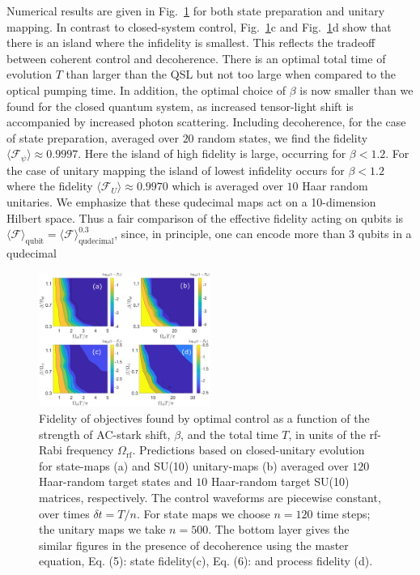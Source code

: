 \documentclass[aps,prl,twocolumn,reprint,superscriptaddress,footinbib]{revtex4-2}
\begin{document}
Numerical results are given in Fig.~\ref{fig:decohrence_quantum_control} for both state preparation and unitary mapping. In contrast to closed-system control,  Fig.~\ref{fig:decohrence_quantum_control}c and Fig.~\ref{fig:decohrence_quantum_control}d show that there is an island  where the  infidelity is smallest. This reflects the tradeoff between coherent control and decoherence.  There is an optimal total time of evolution $T$ than larger than the QSL but not too large when compared to the optical pumping time.  In addition, the optimal choice of  $\beta$ is now smaller than we found for the closed quantum system, as increased tensor-light shift is accompanied by increased photon scattering. Including decoherence, for the case of state preparation, averaged over $20$ random states, we find the fidelity $\langle \mathcal{F}_\psi \rangle \approx 0.9997$.   Here the island of high fidelity is large, occurring for  $\beta< 1.2$. For the case of unitary mapping the island of lowest infidelity  occurs for  $\beta<1.2$ where the fidelity $\langle \mathcal{F}_U \rangle \approx 0.9970$ which is averaged over $10$ Haar random unitaries.  We emphasize that these qudecimal maps act on a 10-dimension Hilbert space.  Thus a fair comparison of the effective fidelity acting on qubits is $\langle \mathcal{F} \rangle_\text{qubit}= \langle \mathcal{F} \rangle_\text{qudecimal}^{0.3}$, since, in principle, one can encode more than 3 qubits in a qudecimal
\begin{figure}
\includegraphics[width=0.5\textwidth]{contour_fig_new_21.eps}

\caption{Fidelity of objectives found by optimal control as a function of the strength of AC-stark shift, $\beta$, and the total time $T$, in units of the rf-Rabi frequency $\Omega_\text{rf}$. Predictions based on closed-unitary evolution for state-maps (a) and  SU(10) unitary-maps (b) averaged over $120$ Haar-random target states and $10$ Haar-random target SU(10) matrices, respectively.  The control waveforms are piecewise constant, over times $\delta t = T/n$.  For state maps we choose $n=120$ time steps; the unitary maps we take $n=500$. The bottom layer gives the similar figures in the presence of decoherence using the master equation, Eq. (5): state fidelity(c), Eq. (6): and process fidelity (d).}
\label{fig:decohrence_quantum_control}
\end{figure}
\end{document}
